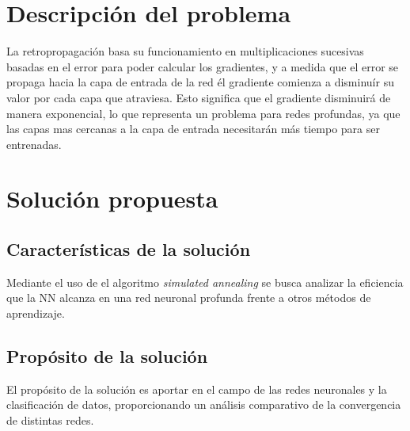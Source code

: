 

\section{Descripción del problema}
La retropropagación basa su funcionamiento en multiplicaciones sucesivas basadas en el error para poder calcular los gradientes, y a medida que el error se propaga hacia la capa de entrada de la red él gradiente comienza a disminuír su valor por cada capa que atraviesa. Esto significa que el gradiente disminuirá de manera exponencial, lo que representa un problema para redes profundas, ya que las capas mas cercanas a la capa de entrada necesitarán más tiempo para ser entrenadas.

\section{Solución propuesta}
\subsection{Características de la solución}
Mediante el uso de el algoritmo {\em simulated annealing} se busca analizar la eficiencia que la NN alcanza en una red neuronal profunda frente a otros métodos de aprendizaje.

\subsection{Propósito de la solución}
El propósito de la solución es aportar en el campo de las redes neuronales y la clasificación de datos, proporcionando un análisis comparativo de la convergencia de distintas redes.
